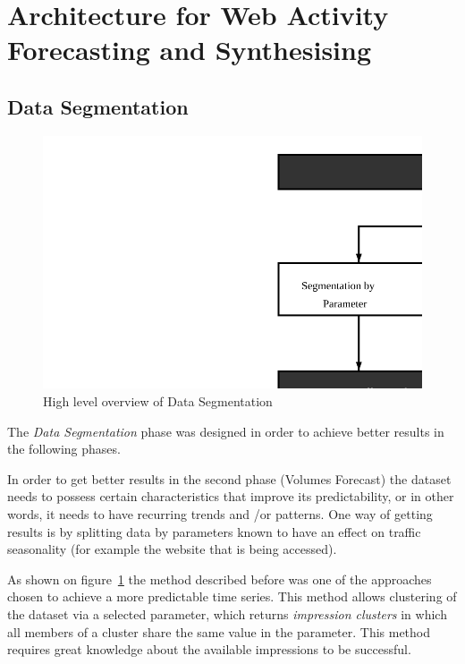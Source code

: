\section{Architecture for Web Activity Forecasting and Synthesising}

\subsection{Data Segmentation}\label{subsec:seg}

\begin{figure}[h] \begin{center} \leavevmode
\includegraphics[]{segmentation} \caption{ High level overview
of Data Segmentation} \label{fig:segmentation_arch} \end{center} \end{figure}

The \emph{Data Segmentation} phase was designed in order to achieve better
results in the following phases. 

In order to get better results in the second phase (Volumes Forecast) the dataset needs to possess
certain characteristics that improve its predictability, or in other words, it
needs to have recurring trends and /or patterns.
One way of getting results is by splitting data by parameters known to have an
effect on traffic seasonality (for example the website that is being accessed).

As shown on figure~\ref{fig:segmentation_arch} the method described before was
one of the approaches chosen to achieve a more predictable time series.
This method allows clustering of the dataset via a selected parameter, which
returns \emph{impression clusters} in which all members of a cluster share the
same value in the parameter. This method requires great knowledge about the
available impressions to be successful.

